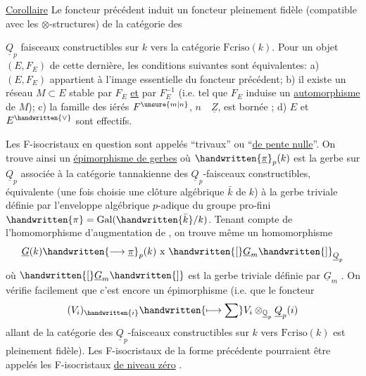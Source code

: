 \uline{Corollaire} Le foncteur précédent induit un foncteur pleinement fidèle (compatible avec les $\otimes$-structures) de la catégorie des


$\underline{Q}_p$ faisceaux constructibles sur $k$ vers la catégorie $\mathrm{Fcriso}(k)$. Pour un objet $(E,F_E)$ de cette dernière, les conditions suivantes sont équivalentes: a) $(E,F_E)$ appartient à l'image essentielle du foncteur précédent; b) il existe un réseau $M\subset E$ stable par $F_E$  \uline{et} par $F_E^{-1}$ (i.e. tel que $F_E$ induise un \uline{automorphisme} de $M$); c) la famille des iérés $F^{\unsure{m|n}}$, $n\quad\underline{Z}$, est bornée ; d) $E$ et $E^{\handwritten{\vee}}$ sont effectifs.

Les F-isocristaux en question sont appelés ``trivaux'' ou ``\uline{de pente nulle}''. On trouve ainsi un \uline{épimorphisme de gerbes}
où $\handwritten{\underline{\pi}}_p(k)$ est la gerbe sur $\underline{Q}_p$  associée à la catégorie tannakienne des $\underline{Q}_p$-faisceaux constructibles, équivalente  (une fois choisie une clôture algébrique $\bar{k}$ de $k$) à la gerbe triviale définie par l'enveloppe algébrique  $p$-adique du groupe pro-fini $\handwritten{\pi}=\operatorname{Gal}(\handwritten{\bar{k}}/k)$. Tenant compte de l'homomorphisme d'augmentation de , on trouve même un homomorphisme
\[
\underline{G}(k)\handwritten{\longrightarrow\underline{\pi}}_p(k)\ \mathrm{x}\ \handwritten{[}\underline{G}_m\handwritten{]}_{\underline{Q}_p}
\]
où $\handwritten{[}\underline{G}_m\handwritten{]}$ est la gerbe triviale définie par $\underline{G}_m$ . On vérifie facilement que c'est encore un épimorphisme (i.e. que le foncteur
\[
(V_i)_{\handwritten{i}}\handwritten{\longmapsto\sum}V_i\otimes_{\underline{\mathbb{Q}}_p}\underline{Q}_p(i)
\]
allant de la catégorie des  $\underline{Q}_p$-faisceaux constructibles  sur $k$ vers $\mathrm{Fcriso}(k)$ est pleinement fidèle). Les F-isocristaux de la forme précédente pourraient être appelés les F-isocristaux \uline{de niveau zéro} .

